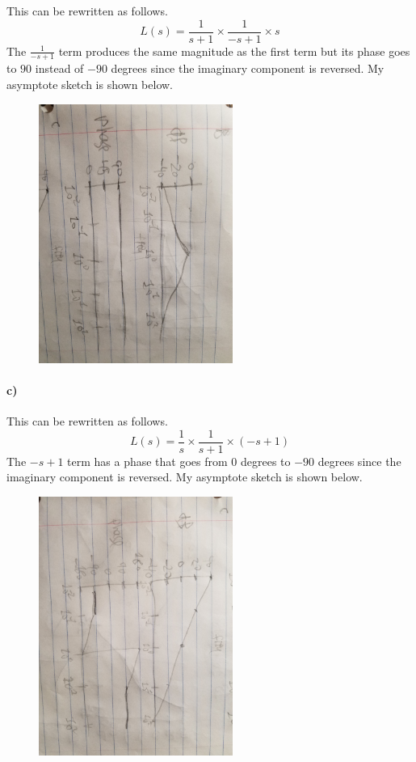 \documentclass[12pt]{article}
\begin{document}
This can be rewritten as follows.
\[L(s)=\frac{1}{s+1}\times\frac{1}{-s+1}\times s\]
The \(\frac{1}{-s+1}\) term produces the same magnitude as the first term but its phase goes to \(90\) instead of \(-90\) degrees since the imaginary component is reversed.
My asymptote sketch is shown below.
\begin{figure}[H]
    \begin{center}
        \includegraphics[width=2.5in]{problem1b.jpg}
    \end{center}
\end{figure}

\paragraph{c)}

This can be rewritten as follows.
\[L(s)=\frac{1}{s}\times\frac{1}{s+1}\times(-s+1)\]
The \(-s+1\) term has a phase that goes from 0 degrees to \(-90\) degrees since the imaginary component is reversed.
My asymptote sketch is shown below.
\begin{figure}[H]
    \begin{center}
        \includegraphics[width=2.5in]{problem1c.jpg}
    \end{center}
\end{figure}
\end{document}
